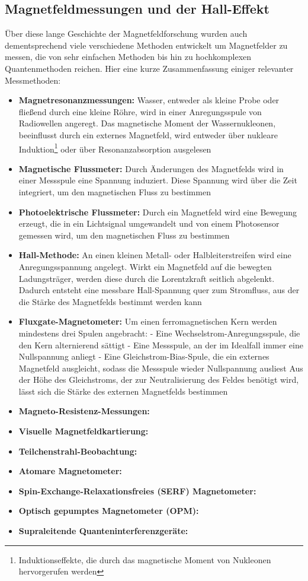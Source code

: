 \documentclass[12pt, a4paper]{article}
\begin{document}
	 
	
	
	
	\subsection{Magnetfeldmessungen und der Hall-Effekt}
	Über diese lange Geschichte der Magnetfeldforschung wurden auch dementsprechend viele verschiedene Methoden entwickelt um Magnetfelder zu messen, die von sehr einfachen Methoden bis hin zu hochkomplexen Quantenmethoden reichen. Hier eine kurze Zusammenfassung einiger relevanter Messmethoden:
	\begin{itemize}
		\item \textbf{Magnetresonanzmessungen:} Wasser, entweder als kleine Probe oder fließend durch eine kleine Röhre, wird in einer Anregungsspule von Radiowellen angeregt. Das magnetische Moment der Wassernukleonen, beeinflusst durch ein externes Magnetfeld, wird entweder über nukleare Induktion\footnote{Induktionseffekte, die durch das magnetische Moment von Nukleonen hervorgerufen werden} oder über Resonanzabsorption ausgelesen
		\item \textbf{Magnetische Flussmeter:} Durch Änderungen des Magnetfelds wird in einer Messspule eine Spannung induziert. Diese Spannung wird über die Zeit integriert, um den magnetischen Fluss zu bestimmen
		\item \textbf{Photoelektrische Flussmeter:} Durch ein Magnetfeld wird eine Bewegung erzeugt, die in ein Lichtsignal umgewandelt und von einem Photosensor gemessen wird, um den magnetischen Fluss zu bestimmen
		\item \textbf{Hall-Methode:} An einen kleinen Metall- oder Halbleiterstreifen wird eine Anregungsspannung angelegt. Wirkt ein Magnetfeld auf die bewegten Ladungsträger, werden diese durch die Lorentzkraft seitlich abgelenkt. Dadurch entsteht eine messbare Hall-Spannung quer zum Stromfluss, aus der die Stärke des Magnetfelds bestimmt werden kann
		\item \textbf{Fluxgate-Magnetometer:} Um einen ferromagnetischen Kern werden mindestens drei Spulen angebracht:
			\subitem - Eine Wechselstrom-Anregungsspule, die den Kern  alternierend sättigt 
			\subitem - Eine Messspule, an der im Idealfall immer eine Nullspannung anliegt
			\subitem - Eine Gleichstrom-Bias-Spule, die ein externes Magnetfeld ausgleicht, sodass die Messspule wieder Nullspannung ausliest
			\newline
		Aus der Höhe des Gleichstroms, der zur Neutralisierung des Feldes benötigt wird, lässt sich die Stärke des externen Magnetfelds bestimmen
		\item \textbf{Magneto-Resistenz-Messungen:}
		\item \textbf{Visuelle Magnetfeldkartierung:}
		\item \textbf{Teilchenstrahl-Beobachtung: }
		\item \textbf{Atomare Magnetometer:}
		\item \textbf{Spin-Exchange-Relaxationsfreies (SERF) Magnetometer:}
		\item \textbf{Optisch gepumptes Magnetometer (OPM):}
		\item \textbf{Supraleitende Quanteninterferenzgeräte:}
	\end{itemize}
	
\end{document}
